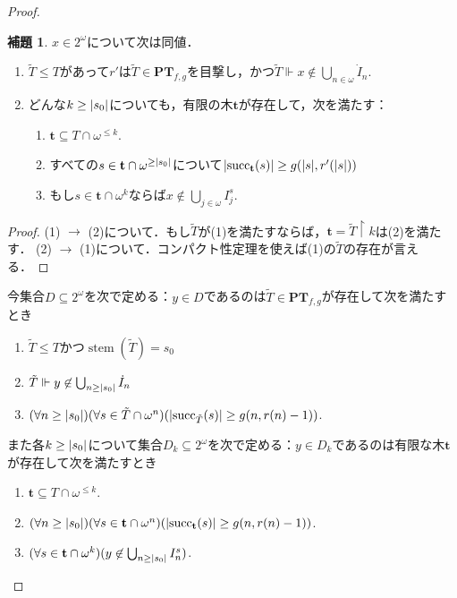 \documentclass[uplatex]{jsarticle}
\newcommand\forces{\Vdash}
\newcommand{\stem}{\operatorname{stem}}
\newcommand{\suc}{\operatorname{succ}}
\newcommand{\PTfg}{\mathbf{PT}_{f,g}}
\DeclarePairedDelimiter\abs{\lvert}{\rvert}
\renewcommand\subset{\subseteq}
\theoremstyle{definition}
\newtheorem{lem}[thm]{補題}
\begin{document}
\begin{proof}
		\begin{lem}\label{finitetree}
			$x \in 2^\omega$について次は同値．
			\begin{enumerate}
				\item $\tilde{T} \le T$があって$r'$は$\tilde{T} \in \PTfg$を目撃し，かつ$\tilde{T} \forces x \not \in \bigcup_{n \in \omega} \dot{I}_n$.
				\item どんな$k \ge \abs{s_0}$についても，有限の木$\mathbf{t}$が存在して，次を満たす：
				\begin{enumerate}
					\item $\mathbf{t} \subset T \cap \omega^{\le k}$.
					\item すべての$s \in \mathbf{t} \cap \omega^{\ge\abs{s_0}}$について$\abs{\suc_\mathbf{t}(s)} \ge g(\abs{s}, r'(\abs{s}))$
					\item もし$s \in \mathbf{t} \cap \omega^k$ならば$x \not \in \bigcup_{j \in \omega} I^s_j$.
				\end{enumerate}
			\end{enumerate}
		\end{lem}
		\begin{proof}
			(1) $\rightarrow$ (2)について．もし$\tilde{T}$が(1)を満たすならば，$\mathbf{t} = \tilde{T} \upharpoonright k$は(2)を満たす．
			(2) $\rightarrow$ (1)について．コンパクト性定理を使えば(1)の$\tilde{T}$の存在が言える．
		\end{proof}
	
		今集合$D \subset 2^\omega$を次で定める：$y \in D$であるのは$\tilde{T} \in \PTfg$が存在して次を満たすとき
		\begin{enumerate}
			\item $\tilde{T} \le T$かつ$\stem(\tilde{T}) = s_0$
			\item $\tilde{T} \forces y \not \in \bigcup_{n \ge \abs{s_0}} \dot{I}_n$
			\item $(\forall n \ge \abs{s_0})(\forall s \in \tilde{T} \cap \omega^n)(\abs{\suc_{\tilde{T}}(s)} \ge g(n, r(n)-1))$.
		\end{enumerate}
		また各$k \ge \abs{s_0}$について集合$D_k \subset 2^\omega$を次で定める：$y \in D_k$であるのは有限な木$\mathbf{t}$が存在して次を満たすとき
		\begin{enumerate}
			\item $\mathbf{t} \subset T \cap \omega^{\le k}$.
			\item $(\forall n \ge \abs{s_0})(\forall s \in \mathbf{t} \cap \omega^n)(\abs{\suc_{\mathbf{t}}(s)} \ge g(n, r(n)-1))$.
			\item $(\forall s \in \mathbf{t} \cap \omega^k)(y \not \in \bigcup_{n \ge \abs{s_0}} I^s_n)$.
		\end{enumerate}
	

\end{proof}
\end{document}
